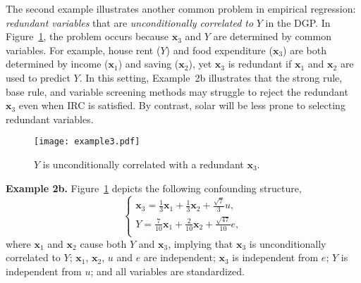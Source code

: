 \documentclass[11pt,review,authoryear]{elsarticle}
\begin{document}
\medskip

The second example illustrates another common problem in empirical regression: \emph{redundant variables} that are \emph{unconditionally correlated to} $Y$ in the DGP. In Figure~\ref{fig:cond_example}, the problem occurs because $\mathbf{x}_3$ and $Y$ are determined by common variables. For example, house rent ($Y$) and food expenditure ($\mathbf{x}_3$) are both determined by income ($\mathbf{x}_1$) and saving ($\mathbf{x}_2$), yet $\mathbf{x}_3$ is redundant if $\mathbf{x}_1$ and $\mathbf{x}_2$ are used to predict $Y$. In this setting, Example~2b illustrates that the strong rule, base rule, and variable screening methods may struggle to reject the redundant $\mathbf{x}_3$ even when IRC is satisfied. By contrast, solar will be less prone to selecting redundant variables.

\begin{figure}[ht]
    \centering
    \texttt{[image: example3.pdf]}
    \caption{$Y$ is unconditionally correlated with a redundant $\mathbf{x}_3$.}
    \label{fig:cond_example}
  \end{figure}

\smallskip
\noindent
\textbf{Example 2b.} Figure~\ref{fig:cond_example} depicts the following confounding structure,
%
\begin{equation}
	\begin{cases}
    \mathbf{x}_3 = \frac{1}{3} \mathbf{x}_1 + \frac{1}{3} \mathbf{x}_2 + \frac{\sqrt{7}}{3} u, \\
    Y = \frac{7}{10} \mathbf{x}_1 +  \frac{2}{10} \mathbf{x}_2 +  \frac{\sqrt{47}}{10} e, \\
	\end{cases}
	\label{eqn:example_4}
\end{equation}
%
where $\mathbf{x}_1$ and $\mathbf{x}_2$ cause both $Y$ and $\mathbf{x}_3$, implying that $\mathbf{x}_3$ is unconditionally correlated to $Y$; $\mathbf{x}_1$, $\mathbf{x}_2$, $u$ and $e$ are independent; $\mathbf{x}_3$ is independent from $e$; $Y$ is independent from $u$; and all variables are standardized.
\end{document}
